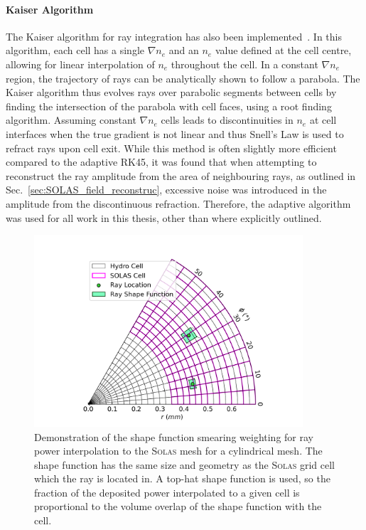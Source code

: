 \paragraph*{Kaiser Algorithm}
The Kaiser algorithm for ray integration has also been implemented~\cite{kaiser_laser_2000}.
In this algorithm, each cell has a single $\nabla n_e$ and an $n_e$ value defined at the cell centre, allowing for linear interpolation of $n_e$ throughout the cell.
In a constant $\nabla n_e$ region, the trajectory of rays can be analytically shown to follow a parabola.
The Kaiser algorithm thus evolves rays over parabolic segments between cells by finding the intersection of the parabola with cell faces, using a root finding algorithm.
Assuming constant $\nabla n_e$ cells leads to discontinuities in $n_e$ at cell interfaces when the true gradient is not linear and thus Snell's Law is used to refract rays upon cell exit.
While this method is often slightly more efficient compared to the adaptive RK45, it was found that when attempting to reconstruct the ray amplitude from the area of neighbouring rays, as outlined in Sec.~\ref{sec:SOLAS_field_reconstruc}, excessive noise was introduced in the amplitude from the discontinuous refraction.
Therefore, the adaptive algorithm was used for all work in this thesis, other than where explicitly outlined.

\begin{figure}[t!]
    \includegraphics[width=10.0cm]{Numerics/Images/SOLAS_ray_shape_functions.png}
    \centering
    \caption{Demonstration of the shape function smearing weighting for ray power interpolation to the \textsc{Solas} mesh for a cylindrical mesh.
    The shape function has the same size and geometry as the \textsc{Solas} grid cell which the ray is located in.
    A top-hat shape function is used, so the fraction of the deposited power interpolated to a given cell is proportional to the volume overlap of the shape function with the cell.}%
    \label{fig:SOLAS_ray_shapefunction}
\end{figure}

